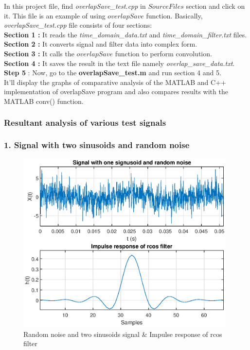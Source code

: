 \begin{refsection}
In this project file, find \textit{overlapSave\_test.cpp} in $Source Files$ section and click on it. This file is an example of using $overlapSave$ function. Basically, \textit{overlapSave\_test.cpp} file consists of four sections:\\
\textbf{ Section 1 :} It reads the \textit{time\_domain\_data.txt} and \textit{ time\_domain\_filter.txt} files.\\
\textbf{ Section 2 :} It converts signal and filter data into complex form. \\
\textbf{ Section 3 :} It calls the $overlapSave$ function to perform convolution.\\
\textbf{ Section 4 :} It saves the result in the text file namely \textit{overlap\_save\_data.txt}.\\

\textbf{Step 5} : Now, go to the \textbf{overlapSave\_test.m} and run section 4 and 5.\\
It'll display the graphs of comparative analysis of the MATLAB and C++ implementation of overlapSave program and also compares results with the MATLAB conv() function.


\subsubsection{Resultant analysis of various test signals}

\subsubsection{1. Signal with two sinusoids and random noise}
\begin{figure}[h]
	\centering
	\includegraphics[width=11cm]{./algorithms/overlap_save/figures/randomNoise.eps}
	\caption{Random noise and two sinusoids signal \& Impulse response of rcos filter}\label{randomNoise}
\end{figure}


\end{refsection}
